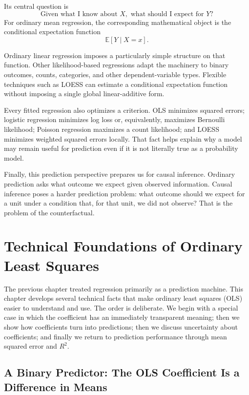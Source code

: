 \documentclass[11pt]{report}
\newcommand{\E}{\mathbb{E}}
\begin{document}
Its central question is
\[
\boxed{
\text{Given what I know about }X,\text{ what should I expect for }Y?
}
\]
For ordinary mean regression, the corresponding mathematical object is the conditional expectation function
\[
\E[Y\mid X=x].
\]

Ordinary linear regression imposes a particularly simple structure on that function. Other likelihood-based regressions adapt the machinery to binary outcomes, counts, categories, and other dependent-variable types. Flexible techniques such as LOESS can estimate a conditional expectation function without imposing a single global linear-additive form.

Every fitted regression also optimizes a criterion. OLS minimizes squared errors; logistic regression minimizes log loss or, equivalently, maximizes Bernoulli likelihood; Poisson regression maximizes a count likelihood; and LOESS minimizes weighted squared errors locally. That fact helps explain why a model may remain useful for prediction even if it is not literally true as a probability model.

Finally, this prediction perspective prepares us for causal inference. Ordinary prediction asks what outcome we expect given observed information. Causal inference poses a harder prediction problem: what outcome should we expect for a unit under a condition that, for that unit, we did not observe? That is the problem of the counterfactual.


\chapter{Technical Foundations of Ordinary Least Squares}
\label{chap:foundations}

The previous chapter treated regression primarily as a prediction machine. This chapter develops several technical facts that make ordinary least squares (OLS) easier to understand and use. The order is deliberate. We begin with a special case in which the coefficient has an immediately transparent meaning; then we show how coefficients turn into predictions; then we discuss uncertainty about coefficients; and finally we return to prediction performance through mean squared error and \(R^2\).

\section{A Binary Predictor: The OLS Coefficient Is a Difference in Means}
\end{document}
